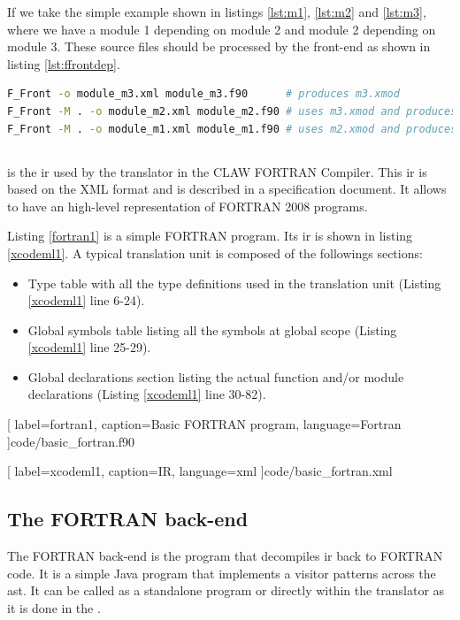 If we take the simple example shown in listings \ref{lst:m1}, \ref{lst:m2} and
\ref{lst:m3}, where we have a module 1 depending on module 2 and module 2
depending on module 3. These source files should be processed by the front-end
as shown in listing \ref{lst:ffrontdep}.

\begin{lstlisting}[label=lst:ffrontdep, language=Bash, caption=Parse module with dependencies]
F_Front -o module_m3.xml module_m3.f90      # produces m3.xmod
F_Front -M . -o module_m2.xml module_m2.f90 # uses m3.xmod and produces m2.xmod
F_Front -M . -o module_m1.xml module_m1.f90 # uses m2.xmod and produces m1.xmod
\end{lstlisting}


\subsection{\xcodeml}
\xcodeml\cite{omni:xcodemlf95,omni:xcodemlf2008} is the \gls{ir} used by the
translator in the CLAW FORTRAN Compiler. This \gls{ir} is based on the XML
format and is described in a specification document. It allows to have an
high-level representation of FORTRAN 2008 programs.

Listing \ref{fortran1} is a simple FORTRAN program. Its \xcodeml \gls{ir} is
shown in listing \ref{xcodeml1}. A typical \xcodeml translation unit is
composed of the followings sections:
\begin{itemize}
\item Type table with all the type definitions used in the translation unit
(Listing \ref{xcodeml1} line 6-24).
\item Global symbols table listing all the symbols at global scope (Listing
\ref{xcodeml1} line 25-29).
\item Global declarations section listing the actual function and/or module
declarations (Listing \ref{xcodeml1} line 30-82).
\end{itemize}


  [
    label=fortran1,
    caption=Basic FORTRAN program,
    language=Fortran
  ]{code/basic_fortran.f90}


  [
    label=xcodeml1,
    caption=\xcodeml IR,
    language=xml
  ]{code/basic_fortran.xml}

\subsection{The FORTRAN back-end}
The FORTRAN back-end is the program that decompiles \gls{ir} back to FORTRAN
code. It is a simple Java program that implements a visitor patterns across
the \gls{ast}. It can be called as a standalone program or directly within the
translator as it is done in the \clawfcomp.

